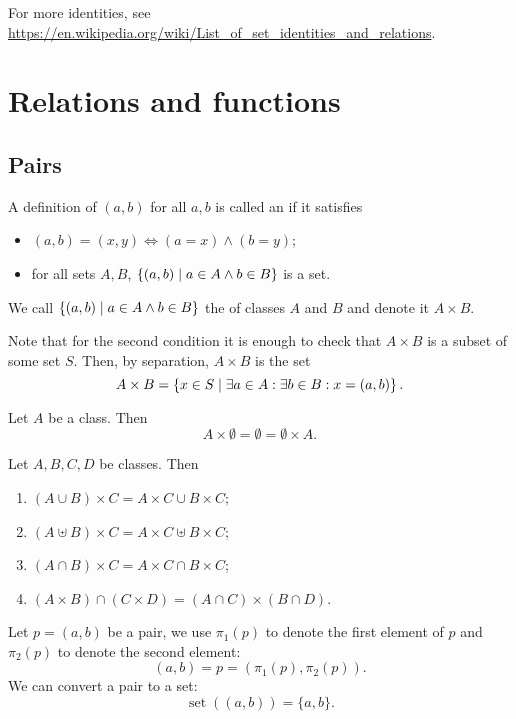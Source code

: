 For more identities, see \url{https://en.wikipedia.org/wiki/List_of_set_identities_and_relations}.


\chapter{Relations and functions}
\section{Pairs}
\begin{definition}
A definition of $(a,b)$ for all $a,b$ is called an  if it satisfies
\begin{itemize}
\item $(a,b) = (x,y) \iff (a=x)\land (b=y)$;
\item for all sets $A,B$, $\left\{ (a,b) \;\middle|\; a\in A\land b\in B \right\}$ is a set.
\end{itemize}
We call $\left\{ (a,b) \;\middle|\; a\in A\land b\in B \right\}$ the  of classes $A$ and $B$ and denote it $A\times B$.
\end{definition}
Note that for the second condition it is enough to check that $A\times B$ is a subset of some set $S$. Then, by separation, $A\times B$ is the set
\[ A\times B = \left\{ x\in S \;\middle|\; \exists a\in A:\exists b\in B: x = (a,b) \right\}. \]

\begin{lemma}
Let $A$ be a class. Then
\[ A\times \emptyset = \emptyset = \emptyset\times A. \]
\end{lemma}

\begin{lemma} \label{productUnionIntersection}
Let $A,B,C,D$ be classes. Then
\begin{enumerate}
\item $(A\cup B)\times C = A\times C \cup B\times C$;
\item $(A\uplus B)\times C = A\times C \uplus B\times C$;
\item $(A\cap B)\times C = A\times C\cap B\times C$;
\item $(A\times B)\cap (C\times D) = (A \cap C)\times (B\cap D)$.
\end{enumerate}
\end{lemma}

\begin{definition}
Let $p = (a,b)$ be a pair, we use $\pi_1(p)$ to denote the first element of $p$ and $\pi_2(p)$ to denote the second element:
\[ (a,b) = p = (\pi_1(p),\pi_2(p)). \]
We can convert a pair to a set:
\[ \operatorname{set}((a,b)) = \{a,b\}. \]
\end{definition}


